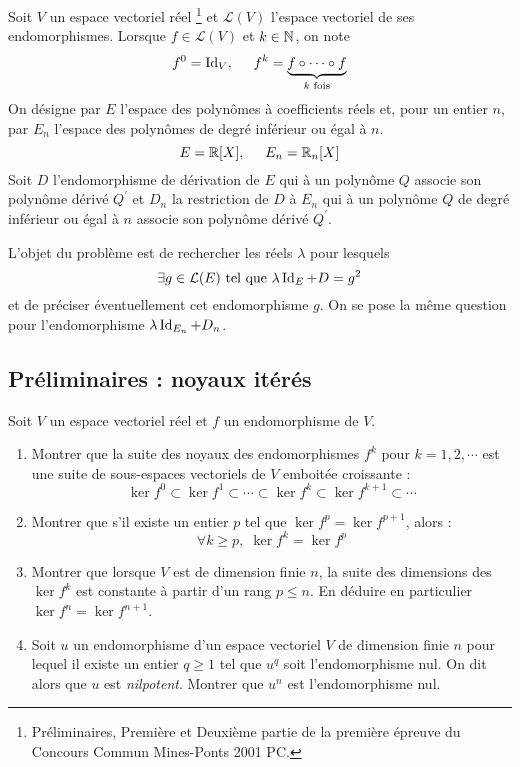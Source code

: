 Soit $V$ un espace vectoriel réel \footnote{Pr{\'e}liminaires, Premi{\`e}re et Deuxi{\`e}me partie de la premi{\`e}re {\'e}preuve
du Concours Commun Mines-Ponts 2001 PC.
} et $\mathcal L (V)$ l'espace vectoriel de ses endomorphismes. Lorsque $f\in \mathcal L (V)$ et $k\in \mathbb{N}$, on note
\begin{displaymath}
 f^0 = {\operatorname{Id}}_V ,\hspace{0.5cm} f^k = \underset{k \text{ fois}}{\underbrace{f \circ \cdots \circ f}}
\end{displaymath}
On désigne par $E$ l'espace des polynômes à coefficients réels et, pour un entier $n$, par $E_n$ l'espace des polynômes de degré inférieur ou égal à $n$.
\begin{displaymath}
 E = \mathbb{R} [X] ,\hspace{0.5cm} E_n = \mathbb{R}_n[X]
\end{displaymath}
Soit $D$ l'endomorphisme de dérivation de $E$ qui à un polynôme $Q$ associe son polynôme dérivé $Q^\prime$ et $D_n$ la restriction de $D$ à $E_n$ qui à un polynôme $Q$ de degré inférieur ou égal à $n$ associe son polynôme dérivé $Q^\prime$.

L'objet du problème est de rechercher les réels $\lambda$ pour lesquels
\begin{displaymath}
  \exists g\in \mathcal{L}(E) \text{ tel que } \lambda \operatorname{Id} _E +D = g^2
\end{displaymath}
et de préciser éventuellement cet endomorphisme $g$. On se pose la même question pour l'endomorphisme $\lambda \operatorname{Id} _{E_n} +D_n$.

\subsection*{Préliminaires : noyaux itérés}
Soit $V$ un espace vectoriel réel et $f$ un endomorphisme de $V$.
\begin{enumerate}
 \item Montrer que la suite des noyaux des endomorphismes $f^k$ pour $k=1,2,\cdots $ est une suite de sous-espaces vectoriels de $V$ emboitée croissante :
\begin{displaymath}
 \ker f^0 \subset \ker f^1 \subset \cdots \subset \ker f^k\subset \ker f^{k+1}\subset \cdots
\end{displaymath}
\item Montrer que s'il existe un entier $p$ tel que $\ker f^p = \ker f^{p+1}$, alors :
\begin{displaymath}
 \forall k\geq p,\; \ker f^k = \ker f^p
\end{displaymath}
\item Montrer que lorsque $V$ est de dimension finie $n$, la suite des dimensions des $\ker f^k$ est constante à partir d'un rang $p \leq n$. En déduire en particulier $\ker f^n = \ker f^{n+1}$.
\item Soit $u$ un endomorphisme d'un espace vectoriel $V$ de dimension finie $n$ pour lequel il existe un entier $q\geq 1$ tel que $u^q$ soit l'endomorphisme nul. On dit alors que $u$ est \emph{nilpotent}. Montrer que $u^n$ est l'endomorphisme nul.
\end{enumerate}

